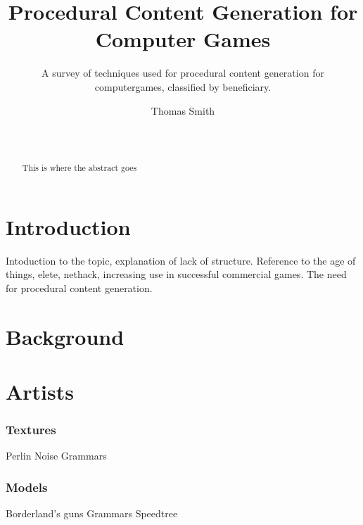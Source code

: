 \documentclass{./acm_proc_article-sp}
\begin{document}
\title{Procedural Content Generation for Computer Games}
\subtitle{A survey of techniques used for procedural content generation for computergames, classified by beneficiary.}

\author{
\alignauthor
Thomas Smith\\
       \\
       \\
}

\maketitle
\begin{abstract}
This is where the abstract goes
\end{abstract}




\section{Introduction}
Intoduction to the topic, explanation of lack of structure. Reference to the age of things, elete, nethack, increasing use in successful commercial games. The need for procedural content generation.

\section{Background}

\section{Artists}

\subsubsection{Textures}
Perlin Noise
Grammars
\subsubsection{Models}
Borderland's guns
Grammars
Speedtree
\end{document}
